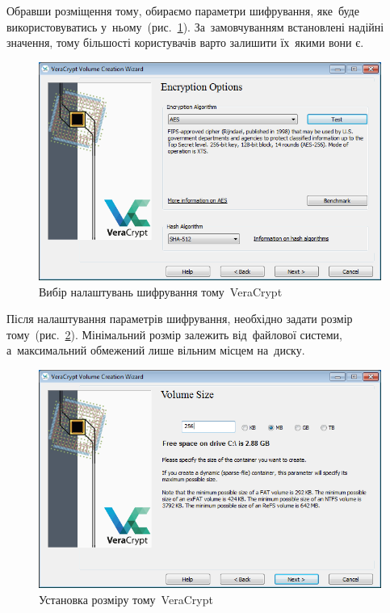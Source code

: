 \documentclass[
	a4paper,
	oneside,
	BCOR = 10mm,
	DIV = 12,
	12pt,
	headings = normal,
]{scrartcl}
\begin{document}
		Обравши розміщення тому, обираємо параметри шифрування, яке~буде використовуватись у~ньому~(рис.~\ref{fig:vc-enc-settings}). За~замовчуванням встановлені надійні значення, тому більшості користувачів варто залишити їх~якими вони є.

		\begin{figure}[!htbp]
			\centering
			\includegraphics[height = 10 \baselineskip]{./assets/05.png}
			\caption{Вибір налаштувань шифрування тому~\textenglish{VeraCrypt}}
			\label{fig:vc-enc-settings}
		\end{figure}

		Після налаштування параметрів шифрування, необхідно задати розмір тому~(рис.~\ref{fig:vc-vol-size}). Мінімальний розмір залежить від~файлової системи, а~максимальний обмежений лише вільним місцем на~диску.

		\begin{figure}[!htbp]
			\centering
			\includegraphics[height = 10 \baselineskip]{./assets/06.png}
			\caption{Установка розміру тому~\textenglish{VeraCrypt}}
			\label{fig:vc-vol-size}
		\end{figure}
\end{document}
